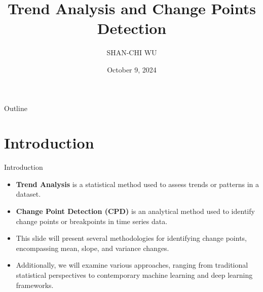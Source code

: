 \documentclass{beamer}
\title{Trend Analysis and Change Points Detection}
\author[SHAN-CHI, WU]{SHAN-CHI WU \inst{}}
\institute[]{\inst{} Institute of Statistical Science, Academia Sinica, Taiwan}
\date{October 9, 2024}%
\begin{document}
\begin{frame}
    \maketitle
\end{frame}

\begin{frame}{Outline}
    \tableofcontents
\end{frame}


\section[Intro.]{Introduction}

\begin{frame}{Introduction}
    \begin{itemize}
        \item \textbf{Trend Analysis} is a statistical method used to assess trends or patterns in a dataset. %
        \bigskip

        \item \textbf{Change Point Detection (CPD)} is an analytical method used to identify change points or breakpoints in time series data. %
        \bigskip
        
        \item This slide will present several methodologies for identifying change points, encompassing mean, slope, and variance changes. 
        \bigskip
        
        \item Additionally, we will examine various approaches, ranging from traditional statistical perspectives to contemporary machine learning and deep learning frameworks. 
    \end{itemize}
\end{frame}
\end{document}
